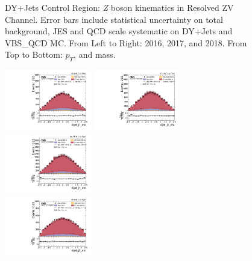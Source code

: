 \begin{figure}[!ht]
  \caption[DY+Jets Control Region: \textit{Z} boson kinematics in Resolved ZV Channel]%
  {DY+Jets Control Region: \textit{Z} boson kinematics in Resolved ZV Channel.
    Error bars include statistical uncertainty on total background,
    JES and QCD scale systematic on DY+Jets and VBS\_QCD MC\@. From Left to Right: 2016,
    2017, and 2018. From Top to Bottom: \( p_T \), and mass.}%
  \label{fig:zjj-cr-vjets-l-v-lep-pt-m}
\end{figure}


\begin{figure}[!ht]
  \centering
  \includegraphics[width=0.335\textwidth]{analysis_plots/2016_zjj/cr_vjets_l/dijet_j1_eta.pdf} \hspace{-10pt}
  \includegraphics[width=0.335\textwidth]{analysis_plots/2017_zjj/cr_vjets_l/dijet_j1_eta.pdf} \hspace{-10pt}
  \includegraphics[width=0.335\textwidth]{analysis_plots/2018_zjj/cr_vjets_l/dijet_j1_eta.pdf} \hspace{-10pt} \\
  \includegraphics[width=0.335\textwidth]{analysis_plots/2016_zjj/cr_vjets_l/dijet_j2_eta.pdf} \hspace{-10pt}

\end{figure}
